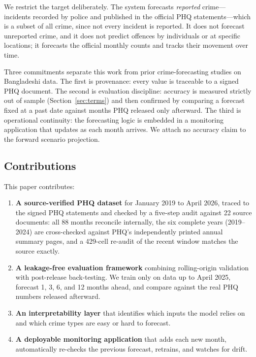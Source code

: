 \documentclass[conference]{IEEEtran}
\begin{document}
We restrict the target deliberately. The system forecasts \emph{reported} crime---incidents
recorded by police and published in the official PHQ statements---which is a subset of all crime,
since not every incident is reported. It does not forecast unreported crime, and it does not
predict offences by individuals or at specific locations; it forecasts the official monthly counts
and tracks their movement over time.

Three commitments separate this work from prior crime-forecasting studies on Bangladeshi data. The
first is provenance: every value is traceable to a signed PHQ document. The second is evaluation
discipline: accuracy is measured strictly out of sample (Section~\ref{sec:terms}) and then
confirmed by comparing a forecast fixed at a past date against months PHQ released only afterward.
The third is operational continuity: the forecasting logic is embedded in a monitoring application
that updates as each month arrives. We attach no accuracy claim to the forward scenario projection.

\subsection{Contributions}
This paper contributes:
\begin{enumerate}
  \item \textbf{A source-verified PHQ dataset} for January 2019 to April 2026, traced to the signed
        PHQ statements and checked by a five-step audit against 22 source documents: all 88 months
        reconcile internally, the six complete years (2019--2024) are cross-checked against PHQ's
        independently printed annual summary pages, and a 429-cell re-audit of the recent window
        matches the source exactly.
  \item \textbf{A leakage-free evaluation framework} combining rolling-origin validation with
        post-release back-testing. We train only on data up to April 2025, forecast 1, 3, 6, and 12
        months ahead, and compare against the real PHQ numbers released afterward.
  \item \textbf{An interpretability layer} that identifies which inputs the model relies on and
        which crime types are easy or hard to forecast.
  \item \textbf{A deployable monitoring application} that adds each new month, automatically
        re-checks the previous forecast, retrains, and watches for drift.
\end{enumerate}
\end{document}
